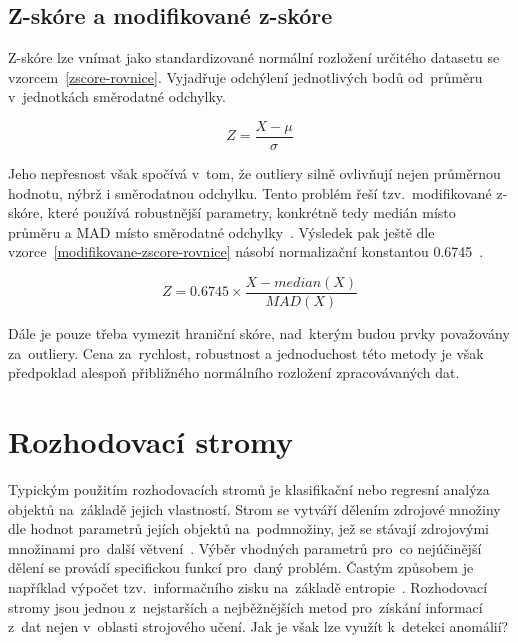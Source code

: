 \subsection{Z-skóre a modifikované z-skóre}
Z-skóre lze vnímat jako standardizované normální rozložení určitého datasetu se vzorcem~\ref{zscore-rovnice}. Vyjadřuje odchýlení jednotlivých bodů od~průměru v~jednotkách směrodatné odchylky.

\begin{equation}
\label{zscore-rovnice}
Z = \dfrac{X - \mu}{\sigma}
\end{equation}

Jeho nepřesnost však spočívá v~tom, že outliery silně ovlivňují nejen průměrnou hodnotu, nýbrž i směrodatnou odchylku. Tento problém řeší tzv.~modifikované z-skóre, které používá robustnější parametry, konkrétně tedy medián místo průměru a MAD místo směrodatné odchylky~\cite{z-score}. Výsledek pak ještě dle vzorce~\ref{modifikovane-zscore-rovnice} násobí normalizační konstantou 0.6745~\cite{z-score}.

\begin{equation}
\label{modifikovane-zscore-rovnice}
Z = 0.6745\times\dfrac{X - median(X)}{MAD(X)}
\end{equation}

Dále je pouze třeba vymezit hraniční skóre, nad~kterým budou prvky považovány za~outliery. Cena za~rychlost, robustnost a jednoduchost této metody je však předpoklad alespoň přibližného normálního rozložení zpracovávaných dat.

\section{Rozhodovací stromy}
Typickým použitím rozhodovacích stromů je klasifikační nebo regresní analýza objektů na~základě jejich vlastností. Strom se vytváří dělením zdrojové množiny dle hodnot parametrů jejích objektů na~podmnožiny, jež se stávají zdrojovými množinami pro~další větvení~\cite{decision-trees}. Výběr vhodných parametrů pro~co nejúčinější dělení se provádí specifickou funkcí pro~daný problém. Častým způsobem je například výpočet tzv.~informačního zisku na~základě entropie~\cite{decision-trees}. Rozhodovací stromy jsou jednou z~nejstarších a nejběžnějších metod pro~získání informací z~dat nejen v~oblasti strojového učení. Jak je však lze využít k~detekci anomálií?

